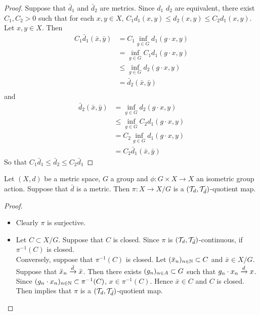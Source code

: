 \documentclass{book}
\begin{document}
	\begin{proof} Suppose that $\bar{d}_1$ and $\bar{d}_2$  are metrics. Since $d_1$ $d_2$ are equivalent, there exist $C_1, C_2 >0$ such that for each $x,y \in X$, $C_1d_1(x,y) \leq d_2(x,y) \leq C_2d_1(x,y)$. Let $x,y \in X$. Then
	\begin{align*}
	C_1\bar{d}_1(\bar{x}, \bar{y}) 
	&= C_1 \inf_{g \in G} d_1(g \cdot x, y) \\
	&=  \inf_{g \in G} C_1 d_1(g \cdot x, y) \\
	&\leq \inf_{g \in G} d_2(g \cdot x, y) \\
	&= \bar{d}_2(\bar{x}, \bar{y}) \\
	\end{align*}	 
	and 
	\begin{align*}
	\bar{d}_2(\bar{x}, \bar{y}) 
	&= \inf_{g \in G} d_2(g \cdot x, y) \\	
	& \leq \inf_{g \in G} C_2 d_1(g \cdot x, y) \\
	&= C_2 \inf_{g \in G}  d_1(g \cdot x, y) \\
	&= C_2 \bar{d}_1(\bar{x}, \bar{y})
	\end{align*}
	So that $C_1 \bar{d}_1 \leq \bar{d}_2 \leq C_2 \bar{d}_1$
	\end{proof}
	
	\begin{ex}
	Let $(X,d)$ be a metric space, $G$ a group and $\phi: G \times X \rightarrow X$ an isometric group action. Suppose that $\bar{d}$ is a metric. Then $\pi: X \rightarrow X/G$ is a $(\mathcal{T}_{d}, \mathcal{T}_{\bar{d}})$-quotient map.
	\end{ex}
	
	\begin{proof}\
	\begin{itemize}
	\item Clearly $\pi$ is surjective. 
	\item Let $C \subset X/G$. Suppose that $C$ is closed. Since $\pi$ is $(\mathcal{T}_{d}, \mathcal{T}_{\bar{d}})$-continuous, if $\pi^{-1}(C)$ is closed. \\
	Conversely, suppose that $\pi^{-1}(C)$ is closed. Let $(\bar{x}_n)_{n \in \mathbb{N}} \subset C$ and $\bar{x} \in X/G$. Suppose that $\bar{x}_n \xrightarrow{\bar{d}} \bar{x}$. Then there exists $(g_n)_{\alpha \in A} \subset G$ such that $g_n \cdot x_n \xrightarrow{d} x$. Since $(g_n \cdot x_n)_{n \in \mathbb{N}} \subset \pi^{-1}(C)$, $x \in \pi^{-1}(C)$. Hence $\bar{x} \in C$ and $C$ is closed. Then  implies that $\pi$ is a $(\mathcal{T}_{d}, \mathcal{T}_{\bar{d}})$-quotient map.
	\end{itemize}
	\end{proof}
	
\end{document}
